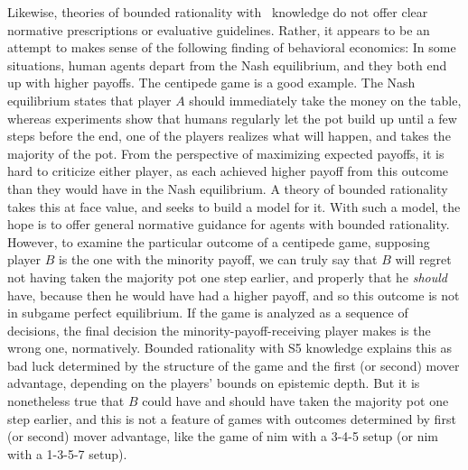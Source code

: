 Likewise, theories of bounded rationality with \SFive\ knowledge do not offer clear normative prescriptions or evaluative guidelines. Rather, it appears to be an attempt to makes sense of the following finding of behavioral economics: In some situations, human agents depart from the Nash equilibrium, and they both end up with higher payoffs. The centipede game is a good example. The Nash equilibrium states that player $A$ should immediately take the money on the table, whereas experiments show that humans regularly let the pot build up until a few steps before the end, one of the players realizes what will happen, and takes the majority of the pot. From the perspective of maximizing expected payoffs, it is hard to criticize either player, as each achieved higher payoff from this outcome than they would have in the Nash equilibrium. A theory of bounded rationality takes this at face value, and seeks to build a model for it. With such a model, the hope is to offer general normative guidance for agents with bounded rationality. However, to examine the particular outcome of a centipede game, supposing player $B$ is the one with the minority payoff, we can truly say that $B$ will regret not having taken the majority pot one step earlier, and properly that he \emph{should} have, because then he would have had a higher payoff, and so this outcome is not in subgame perfect equilibrium. If the game is analyzed as a sequence of decisions, the final decision the minority-payoff-receiving player makes is the wrong one, normatively. Bounded rationality with S5 knowledge explains this as bad luck determined by the structure of the game and the first (or second) mover advantage, depending on the players' bounds on epistemic depth. But it is nonetheless true that $B$ could have and should have taken the majority pot one step earlier, and this is not a feature of games with outcomes determined by first (or second) mover advantage, like the game of nim with a 3-4-5 setup (or nim with a 1-3-5-7 setup). 


